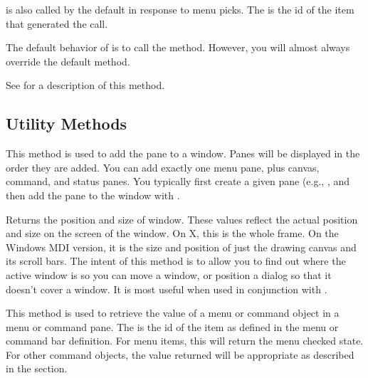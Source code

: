  is also called by the default 
in response to menu picks. The  is the id of the item
that generated the call.

The default behavior of  is to call the
 method. However, you will almost always
override the default  method.


See  for a description of this method.

\subsection* {Utility Methods} %


This method is used to add the pane  to a window.
Panes will be displayed in the order they are added. You can add
exactly one menu pane, plus canvas, command, and status panes.
You typically first create a given pane (e.g., , and then add the pane to the window with
.


Returns the position and size of  window. These values
reflect the actual position and size on the screen of the window.
On X, this is the whole  frame. On the
Windows MDI version, it is the size and position of just the
drawing canvas and its scroll bars. The intent of this method
is to allow you to find out where the active window is so
you can move a window, or position a dialog so that it
doesn't cover a window.
It is most useful when used in
conjunction with .


This method is used to retrieve the value of a menu or command
object in a menu or command pane.  The  is the id of
the item as defined in the menu or command bar definition.
For menu items, this will return the menu checked state.
For other command objects, the value returned will be appropriate
as described in the  section.

